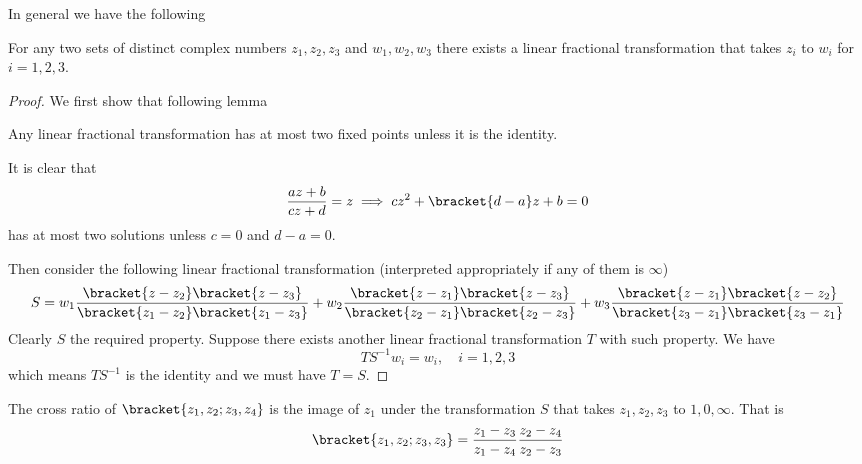 In general we have the following 
\begin{proposition}
    For any two sets of distinct complex numbers \(z_1,z_2,z_3\) and \(w_1,w_2,w_3\) there exists a linear fractional transformation that takes \(z_i\) to \(w_i\) for \(i = 1,2,3\).
\end{proposition}
\begin{proof}
    We first show that following lemma 
    \begin{lemma}
        Any linear fractional transformation has at most two fixed points unless it is the identity. 
    \end{lemma}
    \begin{prooflemma}
        It is clear that 
        \begin{equation*}
            \frac{az + b}{cz + d} = z \implies cz^2 + \bracket{d-a}z + b = 0
        \end{equation*}
        has at most two solutions unless \(c = 0\) and \(d - a = 0\).
    \end{prooflemma}
    Then consider the following linear fractional transformation (interpreted appropriately if any of them is \(\infty\))
    \begin{equation*}
        S = w_1\frac{\bracket{z - z_2}\bracket{z - z_3}}{\bracket{z_1 - z_2} \bracket{z_1 - z_3}} + w_2\frac{\bracket{z - z_1}\bracket{z - z_3}}{\bracket{z_2 - z_1} \bracket{z_2 - z_3}} + w_3\frac{\bracket{z - z_1}\bracket{z - z_2}}{\bracket{z_3 - z_1} \bracket{z_3 - z_1}}
    \end{equation*}
    Clearly \(S\) the required property. Suppose there exists another linear fractional transformation \(T\) with such property. We have 
    \begin{equation*}
        TS^{-1} w_i = w_i , \quad i = 1,2,3
    \end{equation*}
    which means \(TS^{-1}\) is the identity and we must have \(T = S\).
\end{proof}

\begin{definition}
    The cross ratio of \(\bracket{z_1,z_2;z_3,z_4}\) is the image of \(z_1\) under the transformation \(S\) that takes \(z_1,z_2,z_3\) to \(1,0,\infty\). That is 
    \begin{equation*}
        \bracket{z_1,z_2;z_3,z_3} =\frac{z_1 - z_3}{z_1 - z_4} \frac{z_2 - z_4}{z_2 - z_3}
    \end{equation*}
\end{definition}

